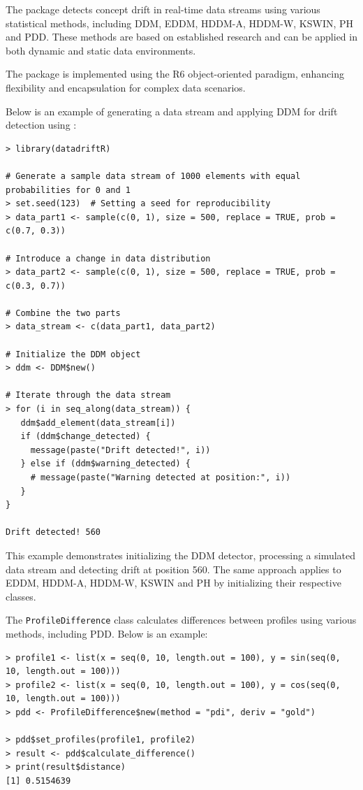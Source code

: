 The  package detects concept drift in real-time data streams using various statistical methods, including DDM, EDDM, HDDM-A, HDDM-W, KSWIN, PH and PDD. These methods are based on established research and can be applied in both dynamic and static data environments.

The package is implemented using the R6 object-oriented paradigm, enhancing flexibility and encapsulation for complex data scenarios.

Below is an example of generating a data stream and applying DDM for drift detection using :

\begin{verbatim}
> library(datadriftR)

# Generate a sample data stream of 1000 elements with equal probabilities for 0 and 1
> set.seed(123)  # Setting a seed for reproducibility
> data_part1 <- sample(c(0, 1), size = 500, replace = TRUE, prob = c(0.7, 0.3))

# Introduce a change in data distribution
> data_part2 <- sample(c(0, 1), size = 500, replace = TRUE, prob = c(0.3, 0.7))

# Combine the two parts
> data_stream <- c(data_part1, data_part2)

# Initialize the DDM object
> ddm <- DDM$new()

# Iterate through the data stream
> for (i in seq_along(data_stream)) {
   ddm$add_element(data_stream[i])
   if (ddm$change_detected) {
     message(paste("Drift detected!", i))
   } else if (ddm$warning_detected) {
     # message(paste("Warning detected at position:", i))
   }
}

Drift detected! 560
\end{verbatim}

This example demonstrates initializing the DDM detector, processing a simulated data stream and detecting drift at position 560. The same approach applies to EDDM, HDDM-A, HDDM-W, KSWIN and PH by initializing their respective classes.

The \texttt{ProfileDifference} class calculates differences between profiles using various methods, including PDD. Below is an example:

\begin{verbatim}
> profile1 <- list(x = seq(0, 10, length.out = 100), y = sin(seq(0, 10, length.out = 100)))
> profile2 <- list(x = seq(0, 10, length.out = 100), y = cos(seq(0, 10, length.out = 100)))
> pdd <- ProfileDifference$new(method = "pdi", deriv = "gold")

> pdd$set_profiles(profile1, profile2)
> result <- pdd$calculate_difference()
> print(result$distance)
[1] 0.5154639
\end{verbatim}

